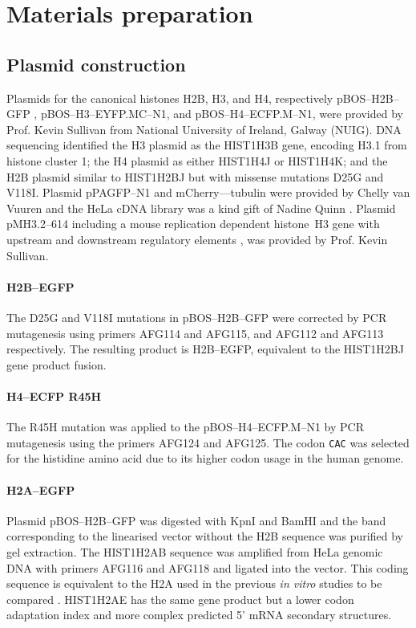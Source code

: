 \section{Materials preparation}

  \subsection{Plasmid construction}
    \label{sec:kill-frap:cloning}

    Plasmids for the canonical histones H2B, H3, and H4,
    respectively pBOS--H2B--GFP \citep{KevinH2BGFP},
    pBOS--H3--EYFP.MC--N1, and pBOS--H4--ECFP.M--N1,
    were provided by Prof. Kevin Sullivan from National University of Ireland,
    Galway (NUIG). DNA sequencing identified the H3 plasmid as the HIST1H3B gene,
    encoding H3.1 from histone cluster 1; the H4 plasmid as either HIST1H4J or HIST1H4K;
    and the H2B plasmid similar to HIST1H2BJ but with missense mutations D25G and V118I.
    Plasmid pPAGFP--N1 and mCherry--\textalpha--tubulin were provided by Chelly van Vuuren
    and the HeLa cDNA library was a kind gift of Nadine Quinn \citep{NadineThesis}.
    Plasmid pMH3.2--614 including a mouse replication dependent histone~H3
    gene with upstream and downstream regulatory elements \citep{pMH3-plasmid},
    was provided by Prof. Kevin Sullivan.

    \paragraph{H2B--EGFP}
      The D25G and V118I mutations in pBOS--H2B--GFP were corrected by PCR mutagenesis
      using primers AFG114 and AFG115, and AFG112 and AFG113 respectively.
      The resulting product is H2B--EGFP, equivalent to the HIST1H2BJ gene product fusion.

    \paragraph{H4--ECFP R45H}
      The R45H mutation was applied to the pBOS--H4--ECFP.M--N1 by
      PCR mutagenesis using the primers AFG124 and AFG125. The codon
      \texttt{CAC} was selected for the histidine amino acid due to its
      higher codon usage in the human genome\citep{codon_usage}.

    \paragraph{H2A--EGFP}
      Plasmid pBOS--H2B--GFP was digested with KpnI and BamHI
      and the band corresponding to the linearised vector without the H2B sequence
      was purified by gel extraction. The HIST1H2AB sequence was amplified
      from HeLa genomic DNA with primers AFG116 and AFG118 and ligated into the vector.
      This coding sequence is equivalent to the H2A used in the previous
      \textit{in vitro} studies to be compared \citep{flaus2004sin}.
      HIST1H2AE has the same gene product but a lower codon adaptation index
      and more complex predicted 5' mRNA secondary structures.

